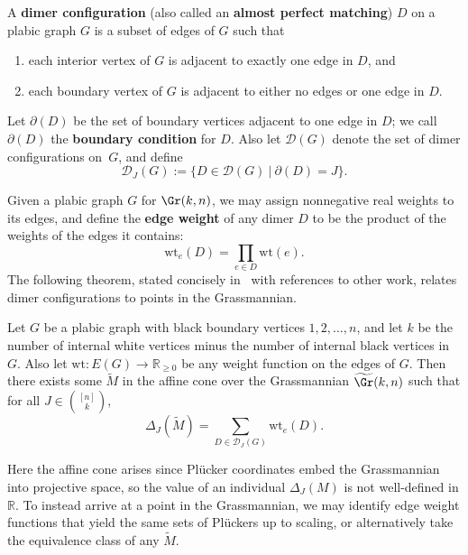 \begin{defi}\label{definition:dimer}
A \textbf{dimer configuration} (also called an \textbf{almost perfect matching}) $D$ on a plabic graph $G$ is a subset of edges of $G$ such that
\begin{enumerate}
\item each interior vertex of $G$ is adjacent to exactly one edge in $D$, and
\item each boundary vertex of $G$ is adjacent to either no edges or one edge in $D$.
\end{enumerate}
Let $\partial(D)$ be the set of boundary vertices adjacent to one edge in $D$; we call $\partial(D)$ the \textbf{boundary condition} for $D$.
Also let $\mathcal{D}(G)$ denote the set of dimer configurations on~$G$, and define \[\mathcal{D}_J(G):=\{D \in \mathcal{D}(G)~|~\partial(D)=J\}.\]
\end{defi}

Given a plabic graph $G$ for $\Gr(k,n)$, we may assign
nonnegative real weights to its edges, and define the \textbf{edge weight} of any dimer $D$ to be the product of the weights of the edges it contains:
\[\text{wt}_e(D) = \prod_{e \in D} \text{wt}(e).\]
The following theorem, stated concisely in~\cite{lam2015} with references to other work, relates dimer configurations to points in the Grassmannian.
\begin{theorem}\label{theorem:edgewts}
Let $G$ be a plabic graph with black boundary vertices $1,2, \dots, n$, and let $k$ be the number of internal white vertices minus the number of internal black vertices in $G$. Also let $\text{wt}: E(G) \longrightarrow \mathbb{R}_{\geq 0}$ be any weight function on the edges of $G$. Then there exists some $\tilde{M}$ in the affine cone over the Grassmannian $\widetilde{\Gr}(k,n)$ such that for all $J \in \binom{[n]}{k}$,
$$\Delta_J(\tilde{M}) = \sum_{D \in \mathcal{D}_J(G)} \text{wt}_e(D).$$
\end{theorem}
\noindent Here the affine cone arises since Pl\"ucker coordinates embed the Grassmannian into projective space, so the value of an individual $\Delta_J(M)$ is not well-defined in $\mathbb{R}$. To instead arrive at a point in the Grassmannian, we may identify edge weight functions that yield the same sets of Pl\"uckers up to scaling, or alternatively take the equivalence class of any $\tilde{M}$.

